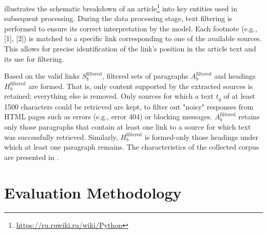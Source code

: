 \documentclass{superfri}
\begin{document}
 illustrates the schematic breakdown of an article\footnote{\url{https://ru.ruwiki.ru/wiki/Python}} into key entities used in subsequent processing.
During the data processing stage, text filtering is performed to ensure its correct interpretation by the model.
Each footnote (e.g., [1], [2]) is matched to a specific link corresponding to one of the available sources.
This allows for precise identification of the link's position in the article text and its use for filtering.


Based on the valid links \(S_b^{\mathrm{filtered}}\), filtered sets of paragraphs \(A_b^{\mathrm{filtered}}\) and headings \(H_b^{\mathrm{filtered}}\) are formed.
That is, only content supported by the extracted sources is retained; everything else is removed.
Only sources for which a text \(t_q\) of at least 1500 characters could be retrieved are kept,
to filter out "noisy" responses from HTML pages such as errors (e.g., error 404) or blocking messages.
\(A_b^{\mathrm{filtered}}\) retains only those paragraphs that contain at least one link to a source for which text was successfully retrieved.
Similarly, \(H_b^{\mathrm{filtered}}\) is formed-only those headings under which at least one paragraph remains.
The characteristics of the collected corpus are presented in .

\section{Evaluation Methodology}
\end{document}
